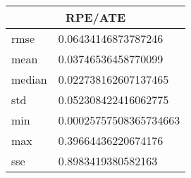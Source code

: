 \begin{table}[!ht] 
 \centering 
 \begin{tabular}{|l|l|} \hline 
 \multicolumn{2}{|c|}{RPE/ATE} \\ \hline 
 rmse & 0.06434146873787246 \\ \hline 
mean & 0.03746536458770099 \\ \hline 
median & 0.022738162607137465 \\ \hline 
std & 0.052308422416062775 \\ \hline 
min & 0.00025757508365734663 \\ \hline 
max & 0.39664436220674176 \\ \hline 
sse & 0.8983419380582163 \\ \hline 
\end{tabular} 
 \end{table}